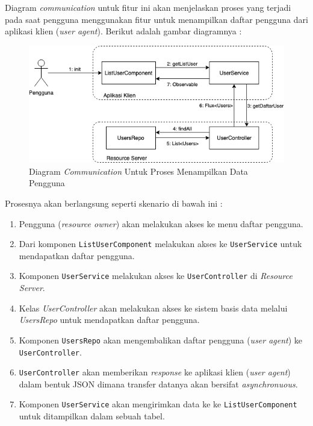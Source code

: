 \documentclass[pdftex,12pt, oneside]{article}
\begin{document}
\begin{itemize}
	Diagram \textit{communication} untuk fitur ini akan menjelaskan proses yang terjadi pada saat pengguna menggunakan fitur untuk menampilkan daftar pengguna dari aplikasi klien (\textit{user agent}). Berikut adalah gambar diagramnya :
	
	\begin{figure}[H]
		\centering
		\includegraphics[width=1\textwidth]{./resources/comm-dia-list-user}
		\caption{Diagram \textit{Communication} Untuk Proses Menampilkan Data Pengguna}
		\label{fig:comm-dia-list-user}
	\end{figure}
	
	Prosesnya akan berlangsung seperti skenario di bawah ini :
	
	\begin{enumerate}
		\item Pengguna (\textit{resource owner}) akan melakukan akses ke menu daftar pengguna.
		\item Dari komponen \texttt{ListUserComponent} melakukan akses ke \texttt{UserService} untuk mendapatkan daftar pengguna.
		\item Komponen \texttt{UserService} melakukan akses ke \texttt{UserController} di \textit{Resource Server}.
		\item Kelas \textit{UserController} akan melakukan akses ke sistem basis data melalui \textit{UsersRepo} untuk mendapatkan daftar pengguna.
		\item Komponen \texttt{UsersRepo} akan mengembalikan daftar pengguna (\textit{user agent}) ke \texttt{UserController}.
		\item \texttt{UserController} akan memberikan \textit{response} ke aplikasi klien (\textit{user agent}) dalam bentuk JSON dimana transfer datanya akan bersifat \textit{asynchronuous}.
		\item Komponen \texttt{UserService} akan mengirimkan data ke ke \texttt{ListUserComponent} untuk ditampilkan dalam sebuah tabel.
	\end{enumerate}
	

\end{itemize}
\end{document}
